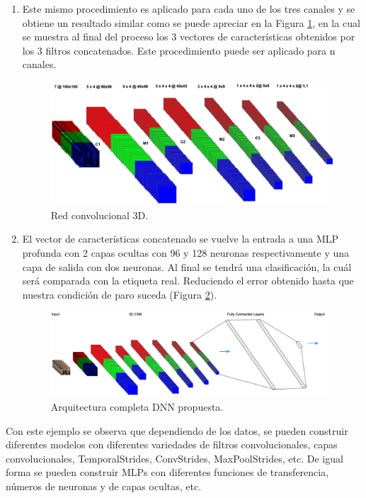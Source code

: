 \begin{onehalfspacing}
\begin{enumerate}
    \item Este mismo procedimiento es aplicado para cada uno de los tres canales y se obtiene un resultado similar como se puede apreciar en la Figura \ref{fig:FIG_3DCNN_DATASET1}, en la cual se muestra al final del proceso los 3 vectores de características obtenidos por los 3 filtros concatenados. Este procedimiento puede ser aplicado para n canales.
    \begin{figure}[h!]
	\centering
	\includegraphics[width=16cm,keepaspectratio]{XX_Figures/FIG_3DCNN_DATASET1.png}
	\caption{\footnotesize Red convolucional 3D.}
	\label{fig:FIG_3DCNN_DATASET1}
    \end{figure}
    
    \item El vector de características concatenado se vuelve la entrada a una MLP profunda con 2 capas ocultas con 96 y 128 neuronas respectivamente y una capa de salida con dos neuronas. Al final se tendrá una clasificación, la cuál será comparada con la etiqueta real. Reduciendo el error obtenido hasta que nuestra condición de paro suceda (Figura \ref{fig:Fig_3DDNN_Piloto}).
    \begin{figure}[h!]
	\centering
	\includegraphics[width=18cm,keepaspectratio]{XX_Figures/Fig_3DDNN_Piloto.png}
	\caption{\footnotesize Arquitectura completa DNN propuesta.}
	\label{fig:Fig_3DDNN_Piloto}
\end{figure}
    
\end{enumerate}


Con este ejemplo se observa que dependiendo de los datos, se pueden construir diferentes modelos con diferentes variedades de filtros convolucionales, capas convolucionales, TemporalStrides, ConvStrides, MaxPoolStrides, etc. De igual forma se pueden construir MLPs con diferentes funciones de transferencia, números de neuronas y de capas ocultas, etc.


\end{onehalfspacing}
